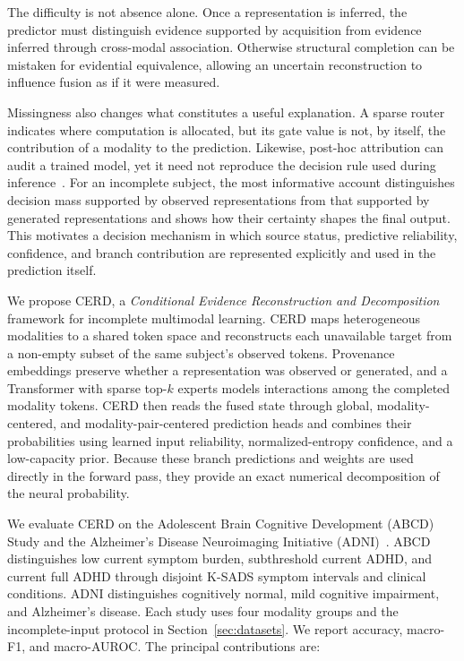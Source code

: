 \documentclass[a4paper,fleqn]{cas-dc}
\begin{document}
The difficulty is not absence alone. Once a representation is inferred, the predictor must distinguish evidence supported by acquisition from evidence inferred through cross-modal association. Otherwise structural completion can be mistaken for evidential equivalence, allowing an uncertain reconstruction to influence fusion as if it were measured.

Missingness also changes what constitutes a useful explanation. A sparse router indicates where computation is allocated, but its gate value is not, by itself, the contribution of a modality to the prediction. Likewise, post-hoc attribution can audit a trained model, yet it need not reproduce the decision rule used during inference~\cite{ref_lundberg2017shap,ref_sundararajan2017ig,ref_ribeiro2016lime,ref_rudin2019stop}. For an incomplete subject, the most informative account distinguishes decision mass supported by observed representations from that supported by generated representations and shows how their certainty shapes the final output. This motivates a decision mechanism in which source status, predictive reliability, confidence, and branch contribution are represented explicitly and used in the prediction itself.

We propose CERD, a \emph{Conditional Evidence Reconstruction and Decomposition} framework for incomplete multimodal learning. CERD maps heterogeneous modalities to a shared token space and reconstructs each unavailable target from a non-empty subset of the same subject's observed tokens. Provenance embeddings preserve whether a representation was observed or generated, and a Transformer with sparse top-\(k\) experts models interactions among the completed modality tokens. CERD then reads the fused state through global, modality-centered, and modality-pair-centered prediction heads and combines their probabilities using learned input reliability, normalized-entropy confidence, and a low-capacity prior. Because these branch predictions and weights are used directly in the forward pass, they provide an exact numerical decomposition of the neural probability.

We evaluate CERD on the Adolescent Brain Cognitive Development (ABCD) Study and the Alzheimer's Disease Neuroimaging Initiative (ADNI)~\cite{garavan2018abcd,ref_adni}. ABCD distinguishes low current symptom burden, subthreshold current ADHD, and current full ADHD through disjoint K-SADS symptom intervals and clinical conditions. ADNI distinguishes cognitively normal, mild cognitive impairment, and Alzheimer's disease. Each study uses four modality groups and the incomplete-input protocol in Section~\ref{sec:datasets}. We report accuracy, macro-F1, and macro-AUROC. The principal contributions are:
\end{document}

